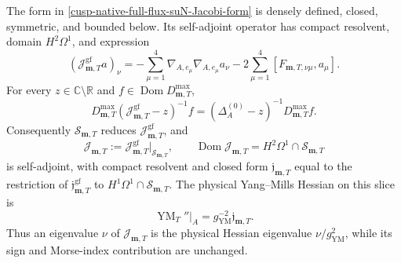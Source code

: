 \begin{proposition}
\label{cusp-native-full-flux-suN-Coulomb-reduction}
The form in \cref{cusp-native-full-flux-suN-Jacobi-form} is densely defined,
closed, symmetric, and bounded below.  Its self-adjoint operator has compact
resolvent, domain \(H^2\Omega^1\), and expression
\begin{equation}
 (\mathcal J_{\mathbf m,T}^{\mathrm{gf}}a)_\nu
 =-\sum_{\mu=1}^4\nabla_{A,e_\mu}\nabla_{A,e_\mu}a_\nu
  -2\sum_{\mu=1}^4[F_{\mathbf m,T,\nu\mu},a_\mu].
 \label{cusp-native-full-flux-suN-Jacobi-expression}
\end{equation}
For every \(z\in\mathbb C\setminus\mathbb R\) and
\(f\in\operatorname{Dom}D_{\mathbf m,T}^{\max}\),
\begin{equation}
 D_{\mathbf m,T}^{\max}
 (\mathcal J_{\mathbf m,T}^{\mathrm{gf}}-z)^{-1}f
 =(\Delta_A^{(0)}-z)^{-1}D_{\mathbf m,T}^{\max}f.
 \label{cusp-native-full-flux-suN-resolvent-intertwining}
\end{equation}
Consequently \(\mathscr S_{\mathbf m,T}\) reduces
\(\mathcal J_{\mathbf m,T}^{\mathrm{gf}}\), and
\begin{equation}
 \mathcal J_{\mathbf m,T}
 :=\mathcal J_{\mathbf m,T}^{\mathrm{gf}}
   \big|_{\mathscr S_{\mathbf m,T}},
 \qquad
 \operatorname{Dom}\mathcal J_{\mathbf m,T}
 =H^2\Omega^1\cap\mathscr S_{\mathbf m,T}
 \label{cusp-native-full-flux-suN-Coulomb-operator}
\end{equation}
is self-adjoint, with compact resolvent and closed form
\(\mathfrak j_{\mathbf m,T}\) equal to the restriction of
\(\mathfrak j_{\mathbf m,T}^{\mathrm{gf}}\) to
\(H^1\Omega^1\cap\mathscr S_{\mathbf m,T}\).  The physical Yang--Mills
Hessian on this slice is
\begin{equation}
 \operatorname{YM}_T''\big|_A
 =g_{\mathrm{YM}}^{-2}\mathfrak j_{\mathbf m,T}.
 \label{cusp-native-full-flux-suN-physical-Hessian}
\end{equation}
Thus an eigenvalue \(\nu\) of \(\mathcal J_{\mathbf m,T}\) is the physical
Hessian eigenvalue \(\nu/g_{\mathrm{YM}}^2\), while its sign and Morse-index
contribution are unchanged.
\end{proposition}

